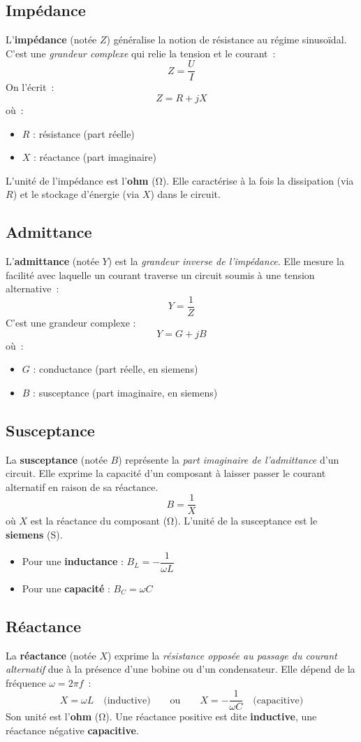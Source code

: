 \subsection{Imp\'edance}\label{subsec:impedance}
L'\textbf{imp\'edance} (not\'ee $Z$) g\'en\'eralise la notion de r\'esistance au r\'egime sinusoïdal. C’est une \emph{grandeur complexe} qui relie la tension et le courant~:
\[
Z = \frac{U}{I}
\]
On l’\'ecrit~:
\[
Z = R + jX
\]
o\`u~:
\begin{itemize}
  \item $R$ : r\'esistance (part r\'eelle)
  \item $X$ : r\'eactance (part imaginaire)
\end{itemize}
L’unit\'e de l’imp\'edance est l’\textbf{ohm} (\unit{\ohm}). Elle caract\'erise à la fois la dissipation (via $R$) et le stockage d’\'energie (via $X$) dans le circuit.

\subsection{Admittance}\label{subsec:admittance}
L'\textbf{admittance} (not\'ee $Y$) est la \emph{grandeur inverse de l'imp\'edance}. Elle mesure la facilit\'e avec laquelle un courant traverse un circuit soumis à une tension alternative~:
\[
Y = \frac{1}{Z}
\]
C’est une grandeur complexe :
\[
Y = G + jB
\]
o\`u~:
\begin{itemize}
  \item $G$ : conductance (part r\'eelle, en siemens)
  \item $B$ : susceptance (part imaginaire, en siemens)
\end{itemize}

\subsection{Susceptance}\label{subsec:susceptance}
La \textbf{susceptance} (not\'ee $B$) repr\'esente la \emph{part imaginaire de l'admittance} d'un circuit.
Elle exprime la capacit\'e d'un composant à laisser passer le courant alternatif en raison de sa r\'eactance.
\[
B = \frac{1}{X}
\]
o\`u $X$ est la r\'eactance du composant (\unit{\ohm}).
L'unit\'e de la susceptance est le \textbf{siemens} (\unit{\siemens}).
\begin{itemize}
  \item Pour une \textbf{inductance} : $B_L = -\dfrac{1}{\omega L}$
  \item Pour une \textbf{capacit\'e} : $B_C = \omega C$
\end{itemize}

\subsection{R\'eactance}\label{subsec:reactance}
La \textbf{r\'eactance} (not\'ee $X$) exprime la \emph{r\'esistance oppos\'ee au passage du courant alternatif} due à la pr\'esence d’une bobine ou d’un condensateur. Elle d\'epend de la fr\'equence $\omega = 2\pi f$~:
\[
X = \omega L \quad \text{(inductive)} \qquad \text{ou} \qquad X = -\frac{1}{\omega C} \quad \text{(capacitive)}
\]
Son unit\'e est l’\textbf{ohm} (\unit{\ohm}). Une r\'eactance positive est dite \textbf{inductive}, une r\'eactance n\'egative \textbf{capacitive}.
